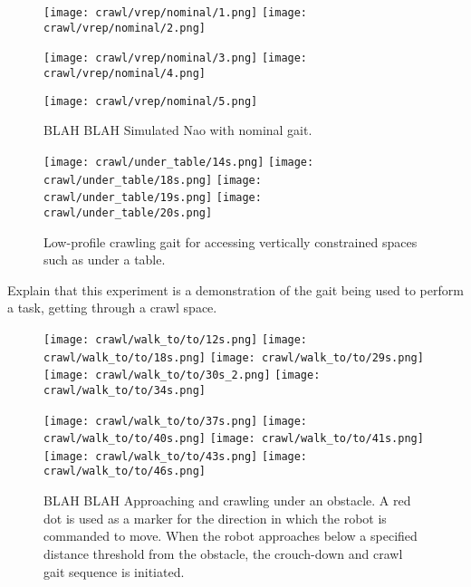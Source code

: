 \begin{figure}
  \centerline{
    \texttt{[image: crawl/vrep/nominal/1.png]}
    \texttt{[image: crawl/vrep/nominal/2.png]}
  }
  \centerline{
    \texttt{[image: crawl/vrep/nominal/3.png]}
    \texttt{[image: crawl/vrep/nominal/4.png]}
  }
  \centerline{
    \texttt{[image: crawl/vrep/nominal/5.png]}
  }
  \caption{BLAH BLAH Simulated Nao with nominal gait.}
  \label{fig:vrep_nao_nom_gait1}
\end{figure}

\begin{figure}
  \centerline{
    \texttt{[image: crawl/under\_table/14s.png]}
    \texttt{[image: crawl/under\_table/18s.png]}
    \texttt{[image: crawl/under\_table/19s.png]}
    \texttt{[image: crawl/under\_table/20s.png]}
  }
  \caption{Low-profile crawling gait for accessing vertically constrained spaces such as under a table.}
  \label{fig:nao_crawl1}
\end{figure}

Explain that this experiment is a demonstration of the gait being used to perform a task,
getting through a crawl space.

\begin{figure}
  \centerline{
    \texttt{[image: crawl/walk\_to/to/12s.png]}
    \texttt{[image: crawl/walk\_to/to/18s.png]}
    \texttt{[image: crawl/walk\_to/to/29s.png]}
    \texttt{[image: crawl/walk\_to/to/30s\_2.png]}
    \texttt{[image: crawl/walk\_to/to/34s.png]}
  }
  \centerline{
    \texttt{[image: crawl/walk\_to/to/37s.png]}
    \texttt{[image: crawl/walk\_to/to/40s.png]}
    \texttt{[image: crawl/walk\_to/to/41s.png]}
    \texttt{[image: crawl/walk\_to/to/43s.png]}
    \texttt{[image: crawl/walk\_to/to/46s.png]}
  }
  \caption{BLAH BLAH Approaching and crawling under an obstacle.
           A red dot is used as a marker for the direction in which the robot is commanded to move.
           When the robot approaches below a specified distance threshold from the obstacle,
           the crouch-down and crawl gait sequence is initiated.}
  \label{fig:nao_crawl3}
\end{figure}

